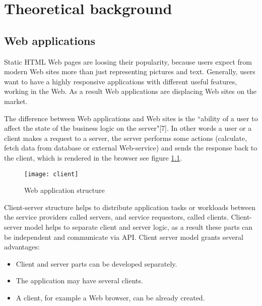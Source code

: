 \chapter{Theoretical background}
\label{ch:background} 
	\section{Web applications}
		
	  Static HTML Web pages are loosing their popularity, because users
	  expect from modern Web sites more than just representing pictures and text.
	  Generally, users want to have a highly responsive applications with
	  different useful features, working in the Web. As a result Web applications are displacing Web
	  sites on the market.
	  
	   The difference between Web applications and Web sites is the
	 ``ability of a user to affect the state of the business logic on the
	 server"[7]. In other words a user or a client makes a request to a server,
	 the server performs some actions (calculate, fetch data from database or
	 external Web-service) and sends the response back to the client, which is rendered in the browser see
	  figure \ref{fig:pic1}.
	  
	  \begin{figure}
      	\texttt{[image: client]}
      	\caption{Web application structure}
      	\label{fig:pic1}
      \end{figure}
	  
    	Client-server structure helps to distribute application tasks or workloads
    	between the service providers called servers, and service requestors,
    	called clients. Client-server model helps to separate client and server logic, as
    	a result these parts can be independent and communicate via API. Client
    	server model grants several advantages:
    	\begin{itemize}
    	  \item Client and server parts can be developed separately.
    	  \item The application may have several clients.
    	  \item A client, for example a Web browser, can be already created.
    	\end{itemize}
    		
